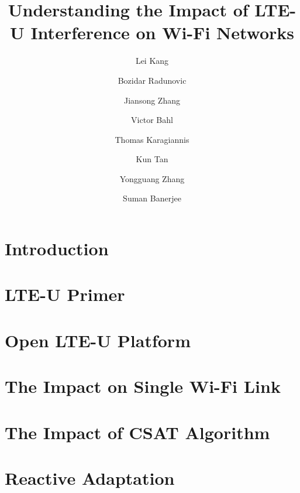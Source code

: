 \documentclass{sig-alternate-10pt}
\begin{document}
\title{Understanding the Impact of LTE-U Interference on Wi-Fi Networks}


\author[1]{Lei Kang}
\author[2]{Bozidar Radunovic}
\author[2]{Jiansong Zhang}
\author[2]{Victor Bahl}
\author[2]{Thomas Karagiannis}
\author[2]{Kun Tan}
\author[2]{Yongguang Zhang}
\author[1]{Suman Banerjee}


\maketitle



\begin{abstract}




\end{abstract}

\section{Introduction}



\section{LTE-U Primer}
\label{sec:primer}


\section{Open LTE-U Platform}
\label{sec:platform}



\section{The Impact on Single Wi-Fi Link}
\label{sec:singlelink}



\section{The Impact of CSAT Algorithm}
\label{sec:csat}



\section{Reactive Adaptation}
\label{sec:solution}

\end{document}
